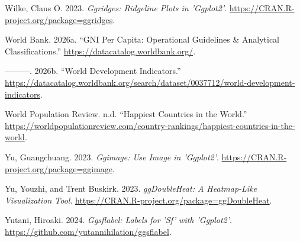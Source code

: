 \documentclass[
  letterpaper,
  DIV=11,
  numbers=noendperiod]{scrreprt}
\newlength{\cslhangindent}
\newenvironment{CSLReferences}[2] %
 {\begin{list}{}{%
  \setlength{\itemindent}{0pt}
  \setlength{\leftmargin}{0pt}
  \setlength{\parsep}{0pt}
  \ifodd #1
   \setlength{\leftmargin}{\cslhangindent}
   \setlength{\itemindent}{-1\cslhangindent}
  \fi
  \setlength{\itemsep}{#2\baselineskip}}}
 {\end{list}}
\begin{document}
\begin{CSLReferences}{1}{0}
Wilke, Claus O. 2023. \emph{Ggridges: Ridgeline Plots in 'Ggplot2'}.
\url{https://CRAN.R-project.org/package=ggridges}.

World Bank. 2026a. {``GNI Per Capita: Operational Guidelines \&
Analytical Classifications.''} \url{https://datacatalog.worldbank.org/}.

---------. 2026b. {``World Development Indicators.''}
\url{https://datacatalog.worldbank.org/search/dataset/0037712/world-development-indicators}.

World Population Review. n.d. {``Happiest Countries in the World.''}
\url{https://worldpopulationreview.com/country-rankings/happiest-countries-in-the-world}.

Yu, Guangchuang. 2023. \emph{Ggimage: Use Image in 'Ggplot2'}.
\url{https://CRAN.R-project.org/package=ggimage}.

Yu, Youzhi, and Trent Buskirk. 2023. \emph{ggDoubleHeat: A Heatmap-Like
Visualization Tool}.
\url{https://CRAN.R-project.org/package=ggDoubleHeat}.

Yutani, Hiroaki. 2024. \emph{Ggsflabel: Labels for 'Sf' with 'Ggplot2'}.
\url{https://github.com/yutannihilation/ggsflabel}.

\end{CSLReferences}
\end{document}
